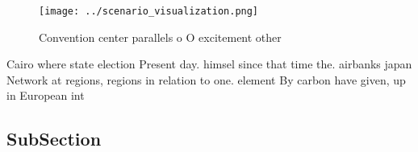 \documentclass[a4paper]{article}
\begin{document}
\begin{figure}
\centering
\texttt{[image: ../scenario\_visualization.png]}
\caption{Convention center parallels o O excitement other 
}
\end{figure}
 
Cairo where state election Present day. himsel since that time the. airbanks japan Network at regions, regions in relation to one. element By carbon have given, up in European int

\subsection{SubSection}
\end{document}
